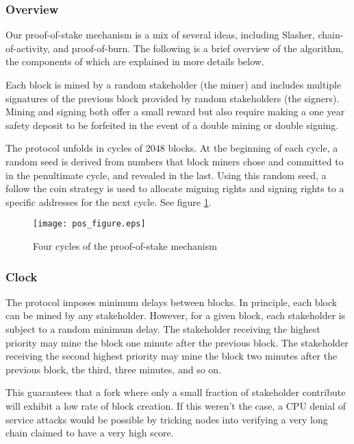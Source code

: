 \documentclass[letterpaper]{article}
\begin{document}
\subsubsection{Overview}

Our proof-of-stake mechanism is a mix of several ideas, including
Slasher\cite{Slasher}, chain-of-activity\cite{CoA}, and proof-of-burn.
The following is a brief overview of the algorithm, the components of which
are explained in more details below.

Each block is mined by a random stakeholder (the miner) and includes
multiple signatures of the previous block provided by random 
stakeholders (the signers). Mining and signing both offer a small reward but
also require making a one year safety deposit to be
forfeited in the event of a double mining or double signing.

The protocol unfolds in cycles of \num{2048} blocks. At the beginning of each
cycle, a random seed is derived from numbers that block miners chose and committed
to in the penultimate cycle, and revealed in the last. Using this random seed,
a follow the coin strategy is used to allocate migning rights and signing rights
to a specific addresses for the next cycle. See figure \ref{fig:pos_figure}.

\begin{figure}[b!]
  \centering
  \texttt{[image: pos\_figure.eps]}
  \caption{Four cycles of the proof-of-stake mechanism}
  \label{fig:pos_figure}
\end{figure}


\subsubsection{Clock}

The protocol imposes minimum delays between blocks. In principle, each block
can be mined by any stakeholder. However, for a given block, each stakeholder
is subject to a random minimum delay. The stakeholder receiving the highest
priority may mine the block one minute after the previous block. The
stakeholder receiving the second highest priority may mine the block two
minutes after the previous block, the third, three minutes, and so on.

This guarantees that a fork where only a small fraction of stakeholder
contribute will exhibit a low rate of block creation. If this weren't 
the case, a CPU denial of service attacks would be possible by
tricking nodes into verifying a very long chain claimed to have a very high
score.
\end{document}
